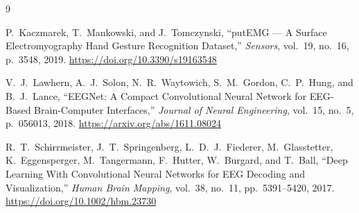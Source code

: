 \documentclass[11pt,twocolumn]{article}
\begin{document}

\begin{thebibliography}{9}

P.~Kaczmarek, T.~Mankowski, and J.~Tomczynski,
``putEMG --- A Surface Electromyography Hand Gesture Recognition Dataset,''
\textit{Sensors}, vol.~19, no.~16, p.~3548, 2019.
\url{https://doi.org/10.3390/s19163548}

V.~J.~Lawhern, A.~J.~Solon, N.~R.~Waytowich, S.~M.~Gordon, C.~P.~Hung, and B.~J.~Lance,
``EEGNet: A Compact Convolutional Neural Network for EEG-Based Brain-Computer Interfaces,''
\textit{Journal of Neural Engineering}, vol.~15, no.~5, p.~056013, 2018.
\url{https://arxiv.org/abs/1611.08024}

R.~T.~Schirrmeister, J.~T.~Springenberg, L.~D.~J.~Fiederer, M.~Glasstetter,
K.~Eggensperger, M.~Tangermann, F.~Hutter, W.~Burgard, and T.~Ball,
``Deep Learning With Convolutional Neural Networks for EEG Decoding and Visualization,''
\textit{Human Brain Mapping}, vol.~38, no.~11, pp.~5391--5420, 2017.
\url{https://doi.org/10.1002/hbm.23730}

\end{thebibliography}
\end{document}
